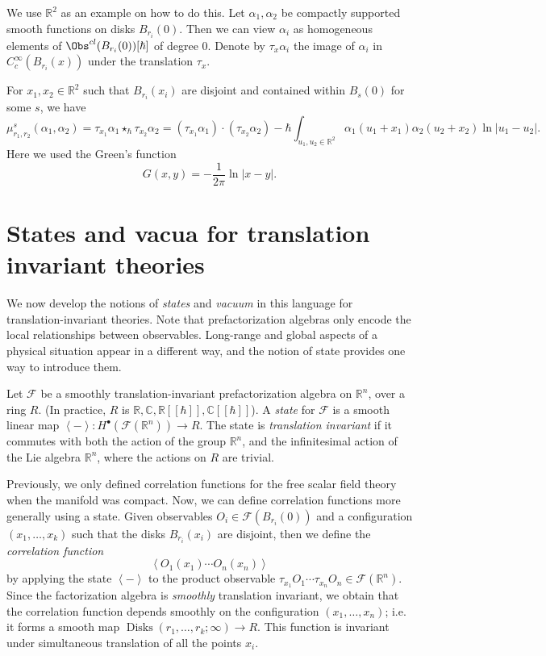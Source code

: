 We use $\mathbb{R} ^2$ as an example on how to do this. Let $\alpha _1,\alpha _2$ be compactly supported smooth functions on disks $B_{r_i} (0)$. Then we can view $\alpha _i$ as homogeneous elements of $\Obs^{cl} (B_{r_i} (0))[\hbar ]$ of degree 0. Denote by $\tau _x\alpha _i$ the image of $\alpha _i$ in $C_c^\infty (B_{r_i} (x))$ under the translation $\tau _x$.

For $x_1,x_2\in\mathbb{R} ^2$ such that $B_{r_i} (x_i)$ are disjoint and contained within $B_s(0)$ for some $s$, we have
\[
	\mu _{r_1,r_2} ^s(\alpha _1,\alpha _2) = \tau _{x_1} \alpha _1 \star _{\hbar } \tau _{x_2} \alpha _2 = (\tau _{x_1} \alpha _1)\cdot (\tau _{x_2} \alpha _2) - \hbar \int_{u_1,u_2\in\mathbb{R} ^2} \alpha _1(u_1 + x_1)\alpha _2(u_2 + x_2)\ln \left| u_1 - u_2 \right| 
.\]
Here we used the Green's function
\[
	G(x,y) = -\frac{1}{2\pi } \ln \left| x-y \right| 
.\]


\section{States and vacua for translation invariant theories}

We now develop the notions of \emph{states} and \emph{vacuum} in this language for translation-invariant theories. Note that prefactorization algebras only encode the local relationships between observables. Long-range and global aspects of a physical situation appear in a different way, and the notion of state provides one way to introduce them.

\begin{definition}\label{dfn:4-9-1}
	Let $\mathcal{F} $ be a smoothly translation-invariant prefactorization algebra on $\mathbb{R} ^n$, over a ring $R$. (In practice, $R$ is $\mathbb{R} ,\mathbb{C},\mathbb{R} [[\hbar ]],\mathbb{C} [[\hbar ]]$). A \emph{state} for $\mathcal{F} $ is a smooth linear map $\left\langle - \right\rangle : H^{\bullet} (\mathcal{F} (\mathbb{R} ^n)) \to R$. The state is \emph{translation invariant} if it commutes with both the action of the group $\mathbb{R} ^n$, and the infinitesimal action of the Lie algebra $\mathbb{R} ^n$, where the actions on $R$ are trivial.
\end{definition}

Previously, we only defined correlation functions for the free scalar field theory when the manifold was compact. Now, we can define correlation functions more generally using a state. Given observables $O_i\in \mathcal{F}(B_{r_i} (0))$ and a configuration $(x_1, \ldots ,x_k)$ such that the disks $B_{r_i} (x_i)$ are disjoint, then we define the \emph{correlation function}
\[
	\left\langle O_1(x_1) \cdots O_n(x_n) \right\rangle 
\]
by applying the state $\left\langle - \right\rangle $ to the product observable $\tau _{x_1} O_1 \cdots \tau _{x_n} O_n\in \mathcal{F} (\mathbb{R} ^n)$. Since the factorization algebra is \emph{smoothly} translation invariant, we obtain that the correlation function depends smoothly on the configuration $(x_1, \ldots ,x_n)$; i.e. it forms a smooth map $\operatorname{Disks} (r_1, \ldots ,r_k ; \infty ) \to R$. This function is invariant under simultaneous translation of all the points $x_i$.

